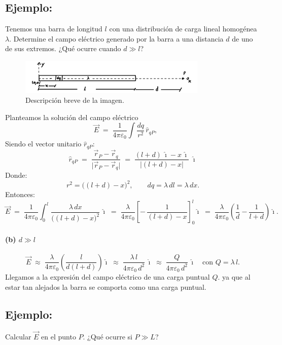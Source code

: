 \documentclass[a4paper,12pt]{article}
\begin{document}
\subsection*{Ejemplo:}
\noindent
Tenemos una barra de longitud $l$ con una distribución de carga lineal homogénea $\lambda$.
Determine el campo eléctrico generado por la barra a una distancia $d$ de uno de sus extremos.
¿Qué ocurre cuando $d \gg l$?

\begin{figure}[h]
  \centering
  \includegraphics[width=0.8\textwidth]{imagen_3.jpeg}
  \caption{Descripción breve de la imagen.}
  \label{fig:imagen3}
\end{figure}
\noindent
Planteamos la solución del campo eléctrico
\[
\vec E \;=\; \frac{1}{4\pi\varepsilon_0}\int \frac{dq}{r^2}\,\hat r_{qP},
\qquad
\]
Siendo el vector unitario $\hat{r}_{qP}$:
\[
\hat r_{qP} \;=\; \frac{\vec r_P-\vec r_q}{\lvert \vec r_P-\vec r_q\rvert}
\;=\; \frac{(l+d)\,\hat{\imath}-x\,\hat{\imath}}{\lvert (l+d)-x\rvert}
\; \hat{\imath}
\]
Donde:
\[
r^2 = \bigl((l+d)-x\bigr)^2,
\qquad
dq = \lambda\,dl = \lambda\,dx.
\]
Entonces:
\[
\vec E \;=\; \frac{1}{4\pi\varepsilon_0}\int_{0}^{l}
\frac{\lambda\,dx}{\bigl((l+d)-x\bigr)^2}\,\hat{\imath}
\;=\;
\frac{\lambda}{4\pi\varepsilon_0}\left[ -\,\frac{1}{(l+d)-x} \right]_{0}^{l}\hat{\imath}
\;=\;
\frac{\lambda}{4\pi\varepsilon_0}\!\left(\frac{1}{d}-\frac{1}{l+d}\right)\hat{\imath}.
\]

\paragraph*{(b) $d\gg l$}
\[
\vec E \;\approx\; \frac{\lambda}{4\pi\varepsilon_0}\left(\frac{l}{d(l+d)}\right)\hat{\imath}
\;\approx\; \frac{\lambda\,l}{4\pi\varepsilon_0\,d^{2}}\,\hat{\imath}
\;\approx\; \frac{Q}{4\pi\varepsilon_0\,d^{2}}\,\hat{\imath}
\quad\text{con } Q=\lambda\,l.
\]
Llegamos a la expresión del campo eléctrico de una carga puntual $Q$. ya que al estar tan alejados la barra se comporta como una carga puntual.

\newpage

\subsection*{Ejemplo:}
\noindent
Calcular $\vec E$ en el punto $P$.  
¿Qué ocurre si $P \gg L$?
\end{document}
